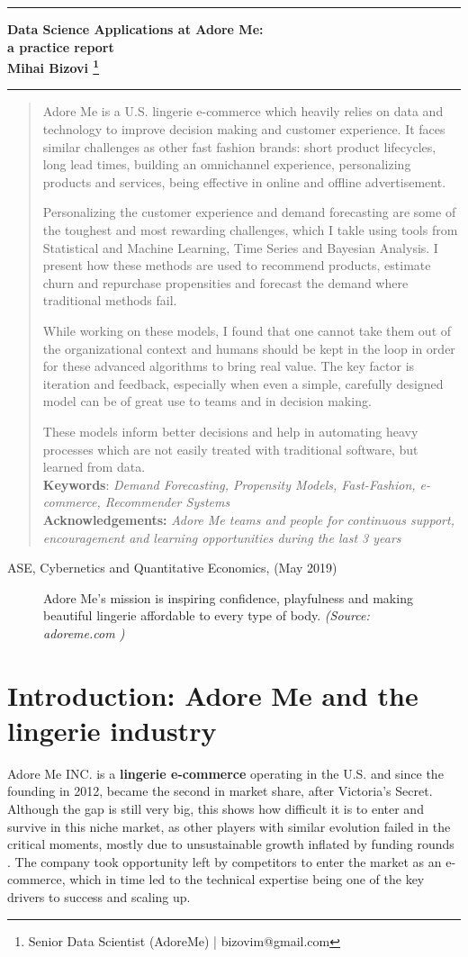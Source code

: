 \documentclass[12pt]{article}
\newcounter{daggerfootnote}
\newcommand*{\daggerfootnote}[1]{%
	\setcounter{daggerfootnote}{\value{footnote}}%
	\renewcommand*{\thefootnote}{\fnsymbol{footnote}}%
	\footnote[2]{#1}%
	\setcounter{footnote}{\value{daggerfootnote}}%
	\renewcommand*{\thefootnote}{\arabic{footnote}}%
}
\newcommand{\BMTitle}[5]{
	\thispagestyle{empty}
	{\parindent0cm
		\rule{\linewidth}{.7ex}}
	\begin{flushright}
		
		\sffamily\bfseries\Huge
		#1\\
		\vspace*{\stretch{0.5}}
		\sffamily\bfseries\large
		#2
	\end{flushright}
	\rule{\linewidth}{.7ex}
	
	
\vspace*{\stretch{3}}
		

\begin{tcolorbox}
	\begin{abstract}
		Adore Me is a U.S. lingerie e-commerce which heavily relies on data and technology to improve decision making and customer experience. It faces similar challenges as other fast fashion brands: short product lifecycles, long lead times, building an omnichannel experience, personalizing products and services, being effective in online and offline advertisement.
		
	 	Personalizing the customer experience and demand forecasting are some of the toughest and most rewarding challenges, which I takle using tools from Statistical and Machine Learning, Time Series and Bayesian Analysis. I present how these methods are used to recommend products, estimate churn and repurchase propensities and forecast the demand where traditional methods fail.
	 	
	 	While working on these models, I found that one cannot take them out of the organizational context and humans should be kept in the loop in order for these advanced algorithms to bring real value. The key factor is iteration and feedback, especially when even a simple, carefully designed model can be of great use to teams and in decision making.
		
		These models inform better decisions and help in automating heavy processes which are not easily treated with traditional software, but learned from data. \\
		


		\noindent \textbf{Keywords}: \textit{Demand Forecasting, Propensity Models, Fast-Fashion, e-commerce, Recommender Systems} \\
		\textbf{Acknowledgements:} \textit{Adore Me teams and people for continuous support, encouragement and learning opportunities during the last 3 years}
	\end{abstract}
	

\end{tcolorbox} 
	
    
	\vspace*{\stretch{1}}
	\begin{center}\sffamily\large{#5}\end{center}
	\newpage
	\thispagestyle{empty}
}
\begin{document}
	


\BMTitle
{Data Science Applications at Adore Me:  \\
    a practice report}           %
{Mihai Bizovi \daggerfootnote{Senior Data Scientist (AdoreMe) | bizovim@gmail.com}
	} 
{12 May, 2019}                             %
{A project for the Logistics Course: \\
	
$\dagger$ Data Scientist (AdoreMe) | bizovim@gmail.com 
 }
{ASE, Cybernetics and Quantitative Economics, (May 2019)}  %
	
\newpage



\vspace*{-3cm}
\begin{figure}[!ht]
	\noindent{}
	\caption{Adore Me's mission is inspiring confidence, playfulness and making beautiful lingerie affordable to every type of body. \textit{(Source: adoreme.com \cite{adoreme})}}
\end{figure}



\tableofcontents

\newpage 

\listoffigures

\newpage


\onehalfspacing

\section{Introduction: Adore Me and the lingerie industry}

Adore Me INC. is a \textbf{lingerie e-commerce} operating in the U.S. and since the founding in 2012, became the second in market share, after Victoria's Secret. Although the gap is still very big, this shows how difficult it is to enter and survive in this niche market, as other players with similar evolution failed in the critical moments, mostly due to unsustainable growth inflated by funding rounds \cite{bankrupcies}. The company took opportunity left by competitors to enter the market as an e-commerce, which in time led to the technical expertise being one of the key drivers to success and scaling up.  %
\end{document}

